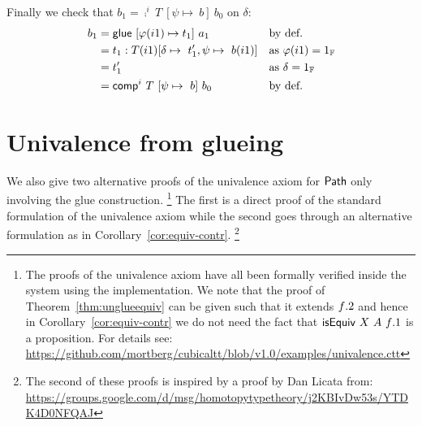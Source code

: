 \medskip

\noindent Finally we check that $b_1 = \comp^i~T~ [\psi\mapsto~b]~b_0$
on $\delta$:
%
\begin{align*}
  b_1  &= {\sf glue} ~[\varphi(i1)\mapsto t_1]~a_1 &&\textrm{by def.} \\
  &=t_1 : T(i1)[\delta\mapsto~t'_1,\psi\mapsto~b(i1)]
  && \textrm{as $\varphi(i1) = 1_{\mathbb{F}}$} \\
  &=t'_1 && \textrm{as $\delta = 1_{\mathbb{F}}$} \\
  &= {\sf comp}^i~T~[\psi\mapsto~b]~b_0 &&  \textrm{by def.}
\end{align*}


\section{Univalence from glueing}
\label{sec:univ-from-glue}

We also give two alternative proofs of the univalence axiom for
${\sf Path}$ only involving the glue construction.%
\footnote{The proofs of the univalence axiom have all been formally
  verified inside the system using the \Haskell{} implementation. We
  note that the proof of Theorem~\ref{thm:unglueequiv} can be given
  such that it extends $f{}.2$ and hence in
  Corollary~\ref{cor:equiv-contr} we do not need the fact that
  ${\sf isEquiv}~X~A~f{}.1$ is a proposition. For details see:\\
  \url{https://github.com/mortberg/cubicaltt/blob/v1.0/examples/univalence.ctt}}
The first is a direct proof of the standard formulation of the
univalence axiom while the second goes through an alternative
formulation as in Corollary~\ref{cor:equiv-contr}.%
\footnote{The second of these proofs is inspired by a proof by Dan Licata from:\\
  \url{https://groups.google.com/d/msg/homotopytypetheory/j2KBIvDw53s/YTDK4D0NFQAJ}}

